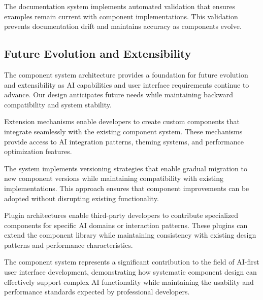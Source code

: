 The documentation system implements automated validation that ensures examples remain current with component implementations. This validation prevents documentation drift and maintains accuracy as components evolve.

\subsection*{Future Evolution and Extensibility}

The component system architecture provides a foundation for future evolution and extensibility as AI capabilities and user interface requirements continue to advance. Our design anticipates future needs while maintaining backward compatibility and system stability.

Extension mechanisms enable developers to create custom components that integrate seamlessly with the existing component system. These mechanisms provide access to AI integration patterns, theming systems, and performance optimization features.

The system implements versioning strategies that enable gradual migration to new component versions while maintaining compatibility with existing implementations. This approach ensures that component improvements can be adopted without disrupting existing functionality.

Plugin architectures enable third-party developers to contribute specialized components for specific AI domains or interaction patterns. These plugins can extend the component library while maintaining consistency with existing design patterns and performance characteristics.

The component system represents a significant contribution to the field of AI-first user interface development, demonstrating how systematic component design can effectively support complex AI functionality while maintaining the usability and performance standards expected by professional developers.
